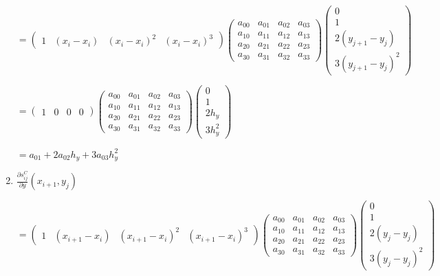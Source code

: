 \documentclass[11pt]{article}
\begin{document}
\begin{enumerate}[label=\textbf{\arabic*)}]
    \begin{flushleft}
    $= \begin{pmatrix}
      1 & (x_i - x_i) & (x_i - x_i)^2 & (x_i - x_i)^3
    \end{pmatrix}
    \begin{pmatrix}
      a_{00}  & a_{01} & a_{02} & a_{03} \\
      a_{10}  & a_{11} & a_{12} & a_{13} \\
      a_{20}  & a_{21} & a_{22} & a_{23} \\
      a_{30}  & a_{31} & a_{32} & a_{33}
    \end{pmatrix}
    \begin{pmatrix}
      0  \\
      1 \\
      2(y_{j + 1} - y_j)  \\
      3(y_{j + 1} - y_j)^2
    \end{pmatrix}$


    $= \begin{pmatrix}
      1 & 0 & 0 & 0
    \end{pmatrix}
    \begin{pmatrix}
      a_{00}  & a_{01} & a_{02} & a_{03} \\
      a_{10}  & a_{11} & a_{12} & a_{13} \\
      a_{20}  & a_{21} & a_{22} & a_{23} \\
      a_{30}  & a_{31} & a_{32} & a_{33}
    \end{pmatrix}
    \begin{pmatrix}
      0  \\
      1  \\
      2h_y  \\
      3h_y^2
    \end{pmatrix}$

    $= a_{01} + 2a_{02}h_y + 3a_{03}h_y^2$
    \end{flushleft}

    \item $\frac{\partial s_{ij}^C}{\partial y}(x_{i + 1}, y_j)$

    \begin{flushleft}
    $= \begin{pmatrix}
      1 & (x_{i + 1} - x_i) & (x_{i + 1} - x_i)^2 & (x_{i + 1} - x_i)^3
    \end{pmatrix}
    \begin{pmatrix}
      a_{00}  & a_{01} & a_{02} & a_{03} \\
      a_{10}  & a_{11} & a_{12} & a_{13} \\
      a_{20}  & a_{21} & a_{22} & a_{23} \\
      a_{30}  & a_{31} & a_{32} & a_{33}
    \end{pmatrix}
    \begin{pmatrix}
      0  \\
      1 \\
      2(y_j - y_j)  \\
      3(y_j - y_j)^2
    \end{pmatrix}$



\end{flushleft}
\end{enumerate}
\end{document}
